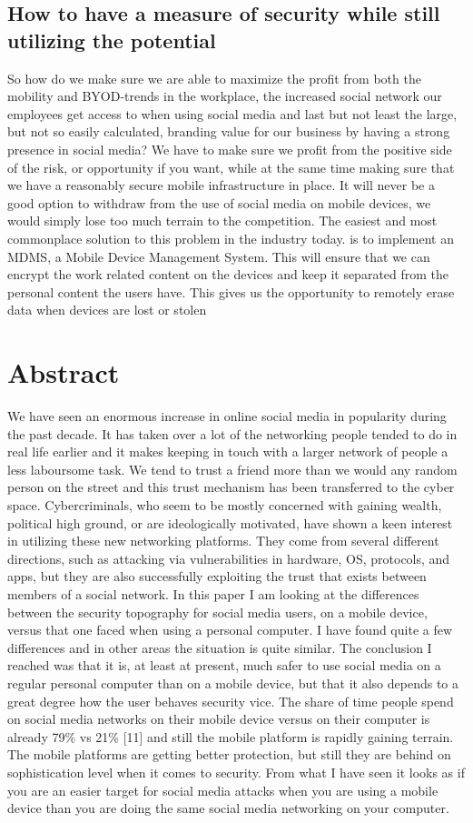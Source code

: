 \subsection*{How to have a measure of security while still utilizing the potential}
So how do we make sure we are able to maximize the profit from both the mobility and BYOD-trends in the workplace, the increased social network our employees get access to when using social media and last but not least the large, but not so easily calculated, branding value for our business by having a strong presence in social media?
We have to make sure we profit from the positive side of the risk, or opportunity if you want, while at the same time making sure that we have a reasonably secure mobile infrastructure in place. It will never be a good option to withdraw from the use of social media on mobile devices, we would simply lose too much terrain to the competition.
The easiest and most commonplace solution to this problem in the industry today. is to implement an MDMS, a Mobile Device Management System. This will ensure that we can encrypt the work related content on the devices and keep it separated from the personal content the users have. This gives us the opportunity to remotely erase data when devices are lost or stolen

\section{Abstract}
We have seen an enormous increase in online social media in popularity during the past decade. It has taken over a lot of the networking people tended to do in real life earlier and it makes keeping in touch with a larger network of people a less laboursome task. We tend to trust a friend more than we would any random person on the street and this trust mechanism has been transferred to the cyber space. Cybercriminals, who seem to be mostly concerned with gaining wealth, political high ground, or are ideologically motivated, have shown a keen interest in utilizing these new networking platforms. They come from several different directions, such as attacking via vulnerabilities in hardware, OS, protocols, and apps, but they are also successfully exploiting the trust that exists between members of a social network.
In this paper I am looking at the differences between the security topography for social media users, on a mobile device, versus that one faced when using a personal computer. I have found quite a few differences and in other areas the situation is quite similar. The conclusion I reached was that it is, at least at present, much safer to use social media on a regular personal computer than on a mobile device, but that it also depends to a great degree how the user behaves security vice. The share of time people spend on social media networks on their mobile device versus on their computer is already 79\% vs 21\% [11] and still the mobile platform is rapidly gaining terrain. The mobile platforms are getting better protection, but still they are behind on sophistication level when it comes to security. From what I have seen it looks as if you are an easier target for social media attacks when you are using a mobile device than you are doing the same social media networking on your computer.


